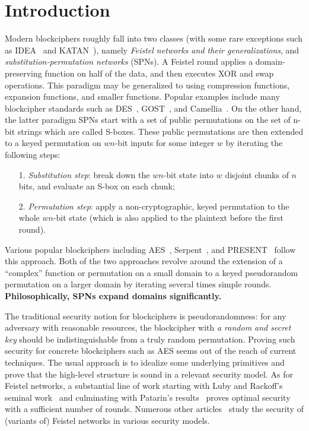 
\section{Introduction}
\label{section:Introduction}

Modern blockciphers roughly fall into two classes (with some rare exceptions such as IDEA~\cite{EC:LaiMas90} and KATAN~\cite{CHES:DeCDunKne09}), namely {\it Feistel networks and their generalizations}, and {\it substitution-permutation networks} (SPNs). A Feistel round applies a domain-preserving function on half of the data, and then executes XOR and swap operations. This paradigm may be generalized to using compression functions, expansion functions, and smaller functions. Popular examples include many blockcipher standards such as DES~\cite{DESDesign}, GOST~\cite{GOSTDesign}, and Camellia~\cite{ISOIEC-18033-3:2010}. On the other hand, the latter paradigm SPNs start with a set of public permutations on the set of n-bit strings which are called S-boxes. These public permutations are then extended to a keyed permutation on $wn$-bit inputs for some integer $w$ by iterating the following steps:
\begin{enumerate}
	\item[1.] {\it Substitution step}: break down the $wn$-bit state into $w$ disjoint chunks of $n$ bits, and evaluate an S-box on each chunk;
	\item[2.] {\it Permutation step}: apply a non-cryptographic, keyed permutation to the whole $wn$-bit state (which is also applied to the plaintext before the first round).
\end{enumerate}
Various popular blockciphers including AES~\cite{AESDesign}, Serpent~\cite{serpentProposal}, and PRESENT~\cite{CHES:BKLPPR07} follow this approach. Both of the two approaches revolve around the extension of a ``complex'' function or permutation on a small domain to a keyed pseudorandom permutation on a larger domain by iterating several times simple rounds. {\bf Philosophically, SPNs expand domains significantly.}



The traditional security notion for blockciphers is pseudorandomness: for any adversary with reasonable resources, the blockcipher with {\it a random and secret key} should be indistinguishable from a truly random
permutation. Proving such security for concrete blockciphers such as AES
seems out of the reach of current techniques. The usual approach is to idealize some underlying primitives and prove that the
high-level structure is sound in a relevant security model. As for Feistel networks, a substantial line of work starting with Luby and Rackoff's seminal work~\cite{DBLP:journals/siamcomp/LubyR88}
and culminating with Patarin's results~\cite{C:patarin03} proves optimal security with
a sufficient number of rounds. Numerous other articles~\cite{C:HoaRog10,JC:CHKPST16} study the security of (variants of) Feistel networks in various
security models.




